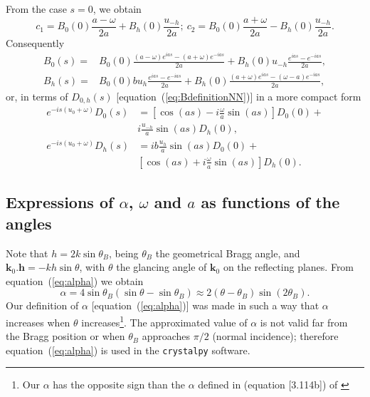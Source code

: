 \documentclass{iucr}
\begin{document}
From the case $s=0$, we obtain
\begin{equation}
\label{eq:cs}
c_1=B_0(0) \frac{a-\omega}{2a}
+ B_h(0) \frac{u_{-h}}{2a};~ 
c_2=B_0(0)
\frac{a+\omega}{2a} - 
B_h(0) \frac{u_{-h}}{2a}. \nonumber
\end{equation}
Consequently
\begin{subequations}
\label{eq:preBSolutions}
\begin{align}
B_0(s) = &B_0(0) \frac{(a-\omega)e^{ias}-(a+\omega) e^{-ias}}{2a} +
B_h(0) u_{-h} \frac{e^{ias} - e^{-ias}}{2a}, \nonumber\\
B_h(s) = &B_0(0) b u_h 
\frac{e^{ias}-e^{-ias}}{2a}
+ B_h(0) 
\frac{(a+\omega) e^{ias}- (\omega-a) e^{-ias}}{2a}
, \nonumber
\end{align}
\end{subequations}
or, in terms of $D_{0,h}(s)$ [equation~(\ref{eq:BdefinitionNN})] in a more compact form
\begin{subequations}
\label{eq:DSolutionsCompact}
\begin{align}
e^{-is(u_0+\omega)} D_0(s) &=  [\cos(as) - i\frac{\omega}{a}\sin(as)] D_0(0) +  \nonumber \\
&i \frac{u_{-h}}{a}\sin(as) D_h(0), \\
e^{-is(u_0+\omega)} D_h(s) &= i b \frac{u_h}{a} \sin(as) D_0(0) + \nonumber \\ 
    &[\cos(as) + i \frac{\omega}{a} \sin(as)] D_h(0).
\end{align}
\end{subequations}

\subsection{Expressions of  $\alpha$, $\omega$ and $a$ as functions of the angles}
\label{sec:physical_meaning}

Note that $h=2k \sin\theta_B$, being $\theta_B$ the geometrical Bragg angle, and $\textbf{k}_0 . \textbf{h}= -k h \sin\theta$, with $\theta$ the glancing angle of $\textbf{k}_0$ on the reflecting planes. From equation~(\ref{eq:alpha}) we obtain
\begin{equation}\label{eq:alphavsangles}
    \alpha=4\sin\theta_B (\sin\theta-\sin\theta_B) \approx 2 (\theta-\theta_B) \sin (2\theta_B).
\end{equation}
Our definition of $\alpha$ [equation~(\ref{eq:alpha})] was made in such a way that $\alpha$ increases when $\theta$ increases\footnote{Our $\alpha$ has the opposite sign than the $\alpha$ defined in (equation [3.114b]) of \cite{ZachariasenBook}}. The approximated value of $\alpha$ is not valid far from the Bragg position or when $\theta_B$ approaches $\pi/2$ (normal incidence); therefore  equation~(\ref{eq:alpha}) is used in the {\tt crystalpy} software.
\end{document}
